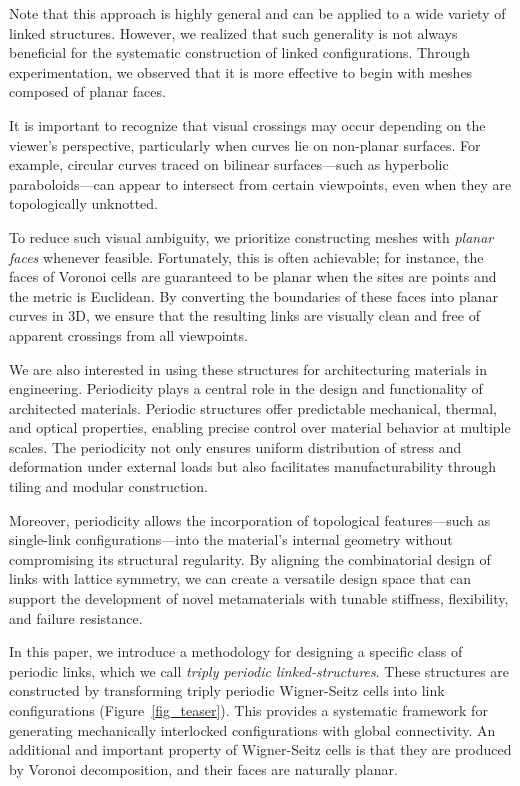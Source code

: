 \documentclass[times,twocolumn,final]{elsarticle}
\newcommand{\ergun}[1]{{\color{red} #1}}
\begin{document}
\ergun{Note that this approach is highly general and can be applied to a wide variety of linked structures. However, we realized that such generality is not always beneficial for the systematic construction of linked configurations. Through experimentation, we observed that it is more effective to begin with meshes composed of planar faces.}

It is important to recognize that visual crossings may occur depending on the viewer’s perspective, particularly when curves lie on non-planar surfaces. For example, circular curves traced on bilinear surfaces—such as hyperbolic paraboloids—can appear to intersect from certain viewpoints, even when they are topologically unknotted.

To reduce such visual ambiguity, we prioritize constructing meshes with \textit{planar faces} whenever feasible. Fortunately, this is often achievable; for instance, the faces of Voronoi cells are guaranteed to be planar when the sites are points and the metric is Euclidean. By converting the boundaries of these faces into \ergun{planar curves in 3D}, we ensure that the resulting links are visually clean and free of apparent crossings from all viewpoints.


\ergun{We are also interested in using these structures for architecturing materials in engineering. Periodicity plays a central role in the design and functionality of architected materials. Periodic structures offer predictable mechanical, thermal, and optical properties, enabling precise control over material behavior at multiple scales. The periodicity not only ensures uniform distribution of stress and deformation under external loads but also facilitates manufacturability through tiling and modular construction.

Moreover, periodicity allows the incorporation of topological features—such as single-link configurations—into the material’s internal geometry without compromising its structural regularity. By aligning the combinatorial design of links with lattice symmetry, we can create a versatile design space that can support the development of novel metamaterials with tunable stiffness, flexibility, and failure resistance. }


In this paper, we introduce a methodology for designing a specific class of periodic links, which we call \textit{triply periodic linked-structures}. These structures are constructed by transforming triply periodic Wigner-Seitz cells into link configurations (Figure~\ref{fig_teaser}). This provides a systematic framework for generating mechanically interlocked configurations with global connectivity.  An additional and important property of  Wigner-Seitz cells is that they are produced by Voronoi decomposition, and their faces are naturally planar.
\end{document}
